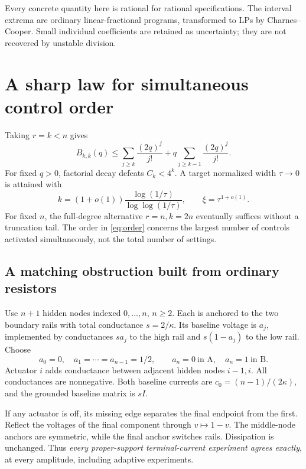 \documentclass[10pt,a4paper]{article}
\begin{document}
Every concrete quantity here is rational for rational specifications. The
interval extrema are ordinary linear-fractional programs, transformed to LPs
by Charnes--Cooper. Small individual coefficients are retained as uncertainty;
they are not recovered by unstable division.

\section{A sharp law for simultaneous control order}

Taking $r=k<n$ gives
\begin{equation}
 B_{k,k}(q)\le\sum_{j\ge k}\frac{(2q)^j}{j!}
       +q\sum_{j\ge k-1}\frac{(2q)^j}{j!}.
\end{equation}
For fixed $q>0$, factorial decay defeats $C_k<4^k$. A target normalized width
$\tau\to0$ is attained with
\begin{equation}
 k=(1+o(1))\frac{\log(1/\tau)}{\log\log(1/\tau)},
 \qquad \xi=\tau^{1+o(1)}.
 \label{eq:order}
\end{equation}
For fixed $n$, the full-degree alternative $r=n,k=2n$ eventually suffices
without a truncation tail. The order in \eqref{eq:order} concerns the largest
number of controls activated simultaneously, not the total number of settings.

\subsection*{A matching obstruction built from ordinary resistors}

Use $n+1$ hidden nodes indexed $0,\ldots,n$, $n\ge2$. Each is anchored to the
two boundary rails with total conductance $s=2/\kappa$. Its baseline voltage is
$a_j$, implemented by conductances $sa_j$ to the high rail and $s(1-a_j)$ to
the low rail. Choose
\[
 a_0=0,\quad a_1=\cdots=a_{n-1}=1/2,
 \qquad a_n=0\ \text{in A},\quad a_n=1\ \text{in B}.
\]
Actuator $i$ adds conductance between adjacent hidden nodes $i-1,i$.
All conductances are nonnegative. Both baseline currents are
$c_0=(n-1)/(2\kappa)$, and the grounded baseline matrix is $sI$.

If any actuator is off, its missing edge separates the final endpoint from the
first. Reflect the voltages of the final component through $v\mapsto1-v$.
The middle-node anchors are symmetric, while the final anchor switches rails.
Dissipation is unchanged. Thus \emph{every proper-support terminal-current
experiment agrees exactly}, at every amplitude, including adaptive experiments.
\end{document}
